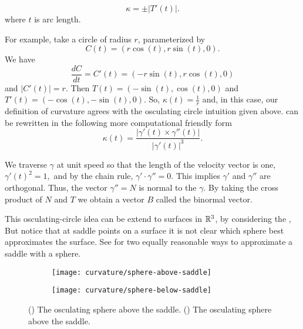 \begin{equation} \label{eqn:kappa}
\kappa= \pm | T'(t)|.
\end{equation}
where $t$ is arc length.

For example, take a circle of radius $r$, parameterized by 
$$C(t)=\left(r\cos(t),r\sin(t),0\right).$$
We have 
$$\frac{dC}{dt}=C'(t)=\left(-r\sin(t),r\cos(t),0\right)$$ and $|C'(t)|=r.$
Then $T(t)=\left(-\sin(t),\cos(t),0\right)$ and
$T'(t)=\left(-\cos(t),-\sin(t),0\right)$.
So, $\kappa(t)=\frac{1}{r}$ and, in this case, our definition of curvature agrees with the
osculating circle intuition given above. 
 can be rewritten in the following more computational friendly form 
\begin{equation} \label{eqn:kappa1}
\kappa(t)=\frac{|\gamma'(t)\times \gamma''(t)|}{|\gamma'(t)|^3}.
\end{equation}

We traverse $\gamma$
at unit speed so that the length of the velocity vector is one, $\gamma'(t)^2=1,$ and by the chain rule, $\gamma'\cdot \gamma''=0$.
This implies $\gamma'$ and $\gamma''$ are orthogonal.
Thus, the
vector $\gamma''=N$ is normal to the $\gamma$. 
By taking the cross product of $N$ and $T$ we obtain a vector $B$ called
the binormal vector.

 This osculating-circle idea can be extend
to  surfaces in $\mathbb{R}^3$, by considering the ,
But notice that at saddle points on a surface it is not clear which sphere
best approximates the surface. See  for two
equally reasonable ways to approximate a saddle with a sphere.

\begin{figure}[htb]
    \captionsetup[subfigure]{justification=centering}
    \centering
    \begin{subfigure}[b]{0.25\textwidth}
        \texttt{[image: curvature/sphere-above-saddle]}
       \subcaption{}\label{fig:sphere-above-saddle}
    \end{subfigure}
        \hspace{1cm}
        \begin{subfigure}[b]{0.25\textwidth}
        \texttt{[image: curvature/sphere-below-saddle]}
        \subcaption{}\label{fig:sphere-below-saddle}
        \end{subfigure}
    \caption{() The osculating sphere above the saddle.
        () The osculating sphere above the saddle.
    }
    \label{fig:osculating-sphere}
\end{figure}




